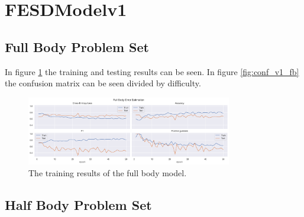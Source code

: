 
\section{FESDModelv1}

\subsection{Full Body Problem Set}
In figure \ref{fig:full_body_training_results_v1} the training and testing results can be seen. In figure \ref{fig:conf_v1_fb} the confusion matrix can be seen divided by difficulty.

\begin{figure}[ht]
  \centering
  \includegraphics[width=0.8\textwidth]{figures/Results/v1/fb/FullBody_ErrorEstimation.png}
  \caption[Full Body model training results]{The training results of the full body model.}
  \label{fig:full_body_training_results_v1}
\end{figure}

\subsection{Half Body Problem Set}

